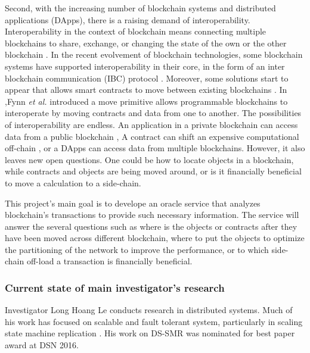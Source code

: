 Second, with the increasing number of blockchain systems and distributed
applications (DApps), there is a raising demand of interoperability.
Interoperability in the context of blockchain means connecting multiple
blockchains to share, exchange, or changing the state of the own or the other
blockchain \cite{buterin2016chain}. In the recent evolvement of blockchain
technologies, some blockchain systems have supported interoperability in their
core, in the form of an inter blockchain communication (IBC) protocol
\cite{kwon2016cosmos, thomas2015protocol, kokoris2018omniledger,
al2017chainspace}. Moreover, some solutions start to appear that allows smart
contracts to move between existing blockchains \cite{fynn2020move,
back2014enabling, herlihy2018atomic}. In \cite{fynn2020move},Fynn \emph{et al.}
introduced a move primitive \cite{fynn2020move} allows programmable blockchains
to interoperate by moving contracts and data from one to another. The
possibilities of interoperability are endless. An application in a private
blockchain can access data from a public blockchain \cite{prusty2018blockchain},
A contract can shift an expensive computational off-chain
\cite{teutsch2019scalable, network2018cheap}, or a DApps can access data from
multiple blockchains. However, it also leaves new open questions. One could be
how to locate objects in a blockchain, while contracts and objects are being
moved around, or is it financially beneficial to move a calculation to a
side-chain.

This project’s main goal is to develope an oracle service that analyzes
blockchain's transactions to provide such necessary information. The service
will answer the several questions such as where is the objects or contracts
after they have been moved across different blockchain, where to put the objects
to optimize the partitioning of the network to improve the performance, or to
which side-chain off-load a transaction is financially beneficial.

\subsubsection{Current state of main investigator's research}

Investigator Long Hoang Le conducts research in distributed systems. Much of his
work has focused on scalable and fault tolerant system, particularly in scaling
state machine replication \cite{le2016dssmr, le2019dynastar, bezerra2016strong}.
His work on DS-SMR \cite{le2016dssmr} was nominated for best paper award at DSN
2016. 


